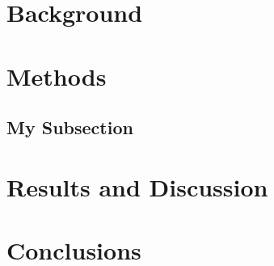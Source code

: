 \section*{Background}
\section*{Methods}
\subsection*{My Subsection}



\section*{Results and Discussion}

\section*{Conclusions}

